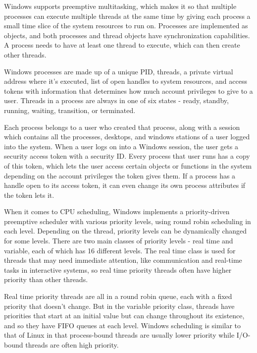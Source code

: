 \documentclass[10pt,draftclsnofoot,onecolumn,letterpaper]{IEEEtran}
\begin{document}
Windows supports preemptive multitasking, which makes it so that multiple processes can execute multiple threads at the same time by giving each process a small time slice of the system resources to run on\cite{4}. Processes are implemented as objects, and both processes and thread objects have synchronization capabilities\cite{3}. A process needs to have at least one thread to execute, which can then create other threads. \par
Windows processes are made up of a unique PID, threads, a private virtual address where it's executed, list of open handles to system resources, and access tokens with information that determines how much account privileges to give to a user. Threads in a process are always in one of six states - ready, standby, running, waiting, transition, or terminated\cite{3}. \par
Each process belongs to a user who created that process, along with a session which contains all the processes, desktops, and windows stations of a user logged into the system. When a user logs on into a Windows session, the user gets a security access token with a security ID. Every process that user runs has a copy of this token, which lets the user access certain objects or functions in the system depending on the account privileges the token gives them. If a process has a handle open to its access token, it can even change its own process attributes if the token lets it\cite{3}. \par
When it comes to CPU scheduling, Windows implements a priority-driven preemptive scheduler with various priority levels, using round robin scheduling in each level. Depending on the thread, priority levels can be dynamically changed for some levels. There are two main classes of priority levels - real time and variable, each of which has 16 different levels. The real time class is used for threads that may need immediate attention, like communication and real-time tasks in interactive systems, so real time priority threads often have higher priority than other threads\cite{3}. \par
Real time priority threads are all in a round robin queue, each with a fixed priority that doesn't change. But in the variable priority class, threads have priorities that start at an initial value but can change throughout its existence, and so they have FIFO queues at each level\cite{3}.
Windows scheduling is similar to that of Linux in that process-bound threads are usually lower priority while I/O-bound threads are often high priority. \par
\end{document}
